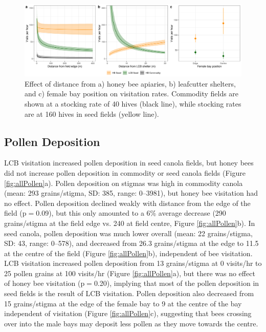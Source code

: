 \documentclass[12pt]{article} %
\begin{document}
\begin{figure}
    \centering
    \includegraphics[width=\textwidth,keepaspectratio=true]{../Figures/allVisits.png}
    \caption{Effect of distance from a) honey bee apiaries, b) leafcutter shelters, and c) female bay position on visitation rates. Commodity fields are shown at a stocking rate of 40 hives (black line), while stocking rates are at 160 hives in seed fields (yellow line).}
    \label{fig:allVisits}
\end{figure}

\subsection*{Pollen Deposition}

LCB visitation increased pollen deposition in seed canola fields, but honey bees did not increase pollen deposition in commodity or seed canola fields (Figure \ref{fig:allPollen}a).
Pollen deposition on stigmas was high in commodity canola (mean: 293 grains/stigma, SD: 385, range: 0--3981), but honey bee visitation had no effect.
Pollen deposition declined weakly with distance from the edge of the field (p$=$0.09), but this only amounted to a 6\% average decrease (290 grains/stigma at the field edge vs. 240 at field centre, Figure \ref{fig:allPollen}b).
In seed canola, pollen deposition was much lower overall (mean: 22 grains/stigma, SD: 43, range: 0--578), and decreased from 26.3 grains/stigma at the edge to 11.5 at the centre of the field (Figure \ref{fig:allPollen}b), independent of bee visitation.
LCB visitation increased pollen deposition from 13 grains/stigma at 0 visits/hr to 25 pollen grains at 100 visits/hr (Figure \ref{fig:allPollen}a), but there was no effect of honey bee visitation (p$=$0.20), implying that most of the pollen deposition in seed fields is the result of LCB visitation.
Pollen deposition also decreased from 15 grains/stigma at the edge of the female bay to 9 at the centre of the bay independent of visitation (Figure \ref{fig:allPollen}c), suggesting that bees crossing over into the male bays may deposit less pollen as they move towards the centre.%
\end{document}
